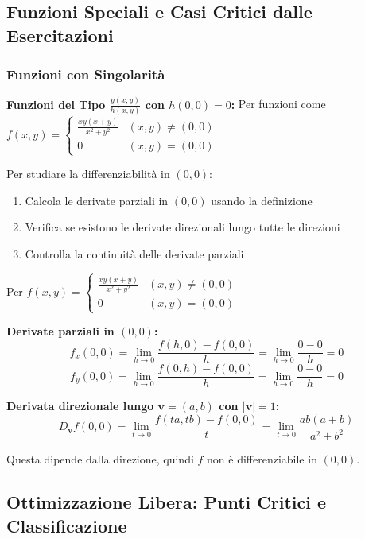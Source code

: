 \subsection{Funzioni Speciali e Casi Critici dalle Esercitazioni}

\subsubsection{Funzioni con Singolarità}

\begin{info}
\textbf{Funzioni del Tipo $\frac{g(x,y)}{h(x,y)}$ con $h(0,0) = 0$:}
Per funzioni come $f(x,y) = \begin{cases}\frac{xy(x+y)}{x^{2}+y^{2}} & (x,y)\ne(0,0)\\ 0 & (x,y)=(0,0)\end{cases}$

Per studiare la differenziabilità in $(0,0)$:
\begin{enumerate}
    \item Calcola le derivate parziali in $(0,0)$ usando la definizione
    \item Verifica se esistono le derivate direzionali lungo tutte le direzioni
    \item Controlla la continuità delle derivate parziali
\end{enumerate}
\end{info}

\begin{esempio}
Per $f(x,y) = \begin{cases}\frac{xy(x+y)}{x^{2}+y^{2}} & (x,y)\ne(0,0)\\ 0 & (x,y)=(0,0)\end{cases}$

\textbf{Derivate parziali in $(0,0)$:}
\[ f_x(0,0) = \lim_{h \to 0} \frac{f(h,0) - f(0,0)}{h} = \lim_{h \to 0} \frac{0 - 0}{h} = 0 \]
\[ f_y(0,0) = \lim_{h \to 0} \frac{f(0,h) - f(0,0)}{h} = \lim_{h \to 0} \frac{0 - 0}{h} = 0 \]

\textbf{Derivata direzionale lungo $\mathbf{v} = (a,b)$ con $|\mathbf{v}| = 1$:}
\[ D_{\mathbf{v}}f(0,0) = \lim_{t \to 0} \frac{f(ta,tb) - f(0,0)}{t} = \lim_{t \to 0} \frac{ab(a+b)}{a^2+b^2} \]

Questa dipende dalla direzione, quindi $f$ non è differenziabile in $(0,0)$.
\end{esempio}

\subsection{Ottimizzazione Libera: Punti Critici e Classificazione}

